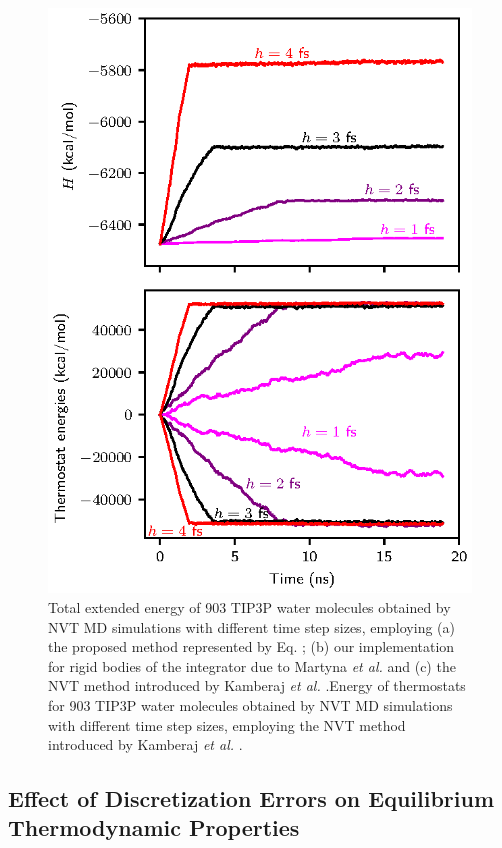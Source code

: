 \documentclass[
journal=jctcce,
layout=twocolumn
]{achemso}
\begin{document}
\begin{figure}
	\includegraphics{Figures/numerical_stability.eps}
    \caption{Total extended energy of 903 TIP3P\cite{Jorgensen_1983} water molecules obtained by NVT MD simulations with different time
step sizes, employing (a) the proposed method represented by Eq. ; (b) our implementation for rigid bodies of the integrator due to Martyna \textit{et al.} \cite{Martyna_1996} and (c) the NVT method introduced by Kamberaj \textit{et al.} \cite{Kamberaj_2005}.Energy of thermostats for 903 TIP3P\cite{Jorgensen_1983} water molecules obtained by NVT MD simulations with different time
step sizes, employing the NVT method introduced by Kamberaj \textit{et al.} \cite{Kamberaj_2005}.}
	\label{fig:num_stab}
\end{figure}

\subsection*{Effect of Discretization Errors on Equilibrium Thermodynamic Properties}
\end{document}
